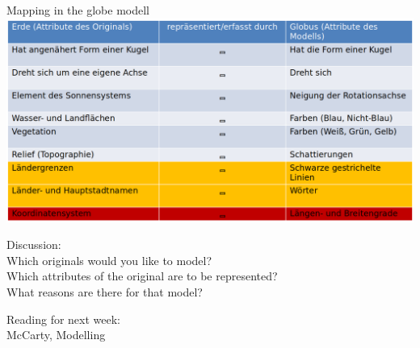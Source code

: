 \begin{frame}{Mapping in the globe modell}
  \includegraphics[width=\textwidth]{img/modell-globus.png}  
\end{frame}


\begin{frame}[standout]
    \alert{Discussion:} \small \\  Which originals would you like to model? \\
    Which attributes of the original are to be represented? \\
    What reasons are there for that model?
\end{frame}


\begin{frame}[standout]
    \alert{Reading} for next week: \\
    McCarty, Modelling 
\end{frame}
